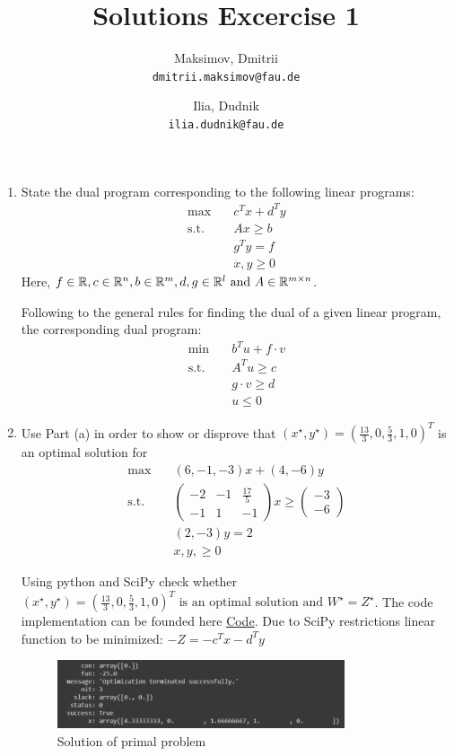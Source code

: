 \documentclass{homework}
\title{Solutions Excercise 1}
\author{
  Maksimov, Dmitrii\\
  \texttt{dmitrii.maksimov@fau.de}
  \and
  Ilia, Dudnik\\
  \texttt{ilia.dudnik@fau.de}
}
\begin{document}
\maketitle

\exercise
\begin{enumerate}[label=(\alph*)]
	\item State the dual program corresponding to the following linear programs:
	\begin{align*}
		\text{max} \quad
		&c^T x + d^T y \\
		\text{s.t.} \quad
		&Ax \geq b \\
		&g^T y = f \\
		&x, y \geq 0
	\end{align*}
	Here, $f \in \mathbb R, c \in \mathbb R^n, b \in \mathbb R^m, d,g \in \mathbb R^l \text{ and } A \in \mathbb R^{m \times n}$.

	Following to the general rules for finding the dual of a given linear program, the corresponding dual program:
		\begin{align*}
			\text{min} \quad
			&b^T u + f\cdot v \\
			\text{s.t.} \quad
			&A^T u \geq c \\
			&g\cdot v \geq d \\
			&u \leq 0
		\end{align*}
	\item Use Part (a) in order to show or disprove that $(x^\star, y^\star) = (\frac{13}{3}, 0, \frac{5}{3}, 1, 0)^T$ is an optimal solution for
		\begin{align*}
			\text{max} \quad
			&(6, -1, -3) x + (4, -6)y \\
			\text{s.t.} \quad
			&\begin{pmatrix}
			-2 & -1 & \frac{17}{5} \\
			-1 & 1 &-1
			\end{pmatrix}x \geq  \begin{pmatrix}
							-3 \\
							-6
							\end{pmatrix}\\
			&(2, -3)y = 2 \\
			&x,y, \geq 0
		\end{align*}

		Using python and SciPy check whether $(x^\star, y^\star) = (\frac{13}{3}, 0, \frac{5}{3}, 1, 0)^T \text{ is an optimal solution and } W^\star = Z^\star$. The code implementation can be founded here \href{https://colab.research.google.com/drive/183PlRiFx1C_aDkJ0yZC86WoozAwRDpcC?usp=sharing}{Code}. Due to SciPy restrictions linear function to be minimized: $-Z = -c^T x - d^T y$
\newpage
\begin{figure}[hbt!]
	\centering
	\includegraphics[width=0.8\textwidth]{primal_solution.png}
	\caption{Solution of primal problem}
\end{figure}


\end{enumerate}
\end{document}
